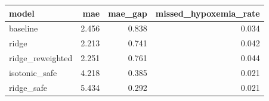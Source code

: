 \begin{tabular}{lrrr}
\toprule
model & mae & mae\_gap & missed\_hypoxemia\_rate \\
\midrule
baseline & 2.456 & 0.838 & 0.034 \\
ridge & 2.213 & 0.741 & 0.042 \\
ridge\_reweighted & 2.251 & 0.761 & 0.044 \\
isotonic\_safe & 4.218 & 0.385 & 0.021 \\
ridge\_safe & 5.434 & 0.292 & 0.021 \\
\bottomrule
\end{tabular}
